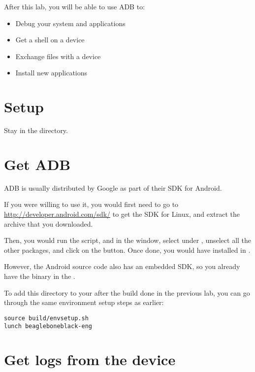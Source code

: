 
After this lab, you will be able to use ADB to:
\begin{itemize}
  \item Debug your system and applications
  \item Get a shell on a device
  \item Exchange files with a device
  \item Install new applications
\end{itemize}

\section{Setup}

Stay in the  directory.

\section{Get ADB}

ADB is usually distributed by Google as part of their SDK for Android.

If you were willing to use it, you would first need to go to
\url{http://developer.android.com/sdk/} to get the SDK for Linux, and
extract the archive that you downloaded.

Then, you would run the  script, and in the
 window, select  under
, unselect all the other packages, and click on the
 button.  Once done, you would have
 installed in .

However, the Android source code also has an embedded SDK, so you
already have the  binary in the
.

To add this directory to your  after the build done in the
previous lab, you can go through the same environment setup steps as
earlier:

\begin{verbatim}
source build/envsetup.sh
lunch beagleboneblack-eng
\end{verbatim}

\section{Get logs from the device}

